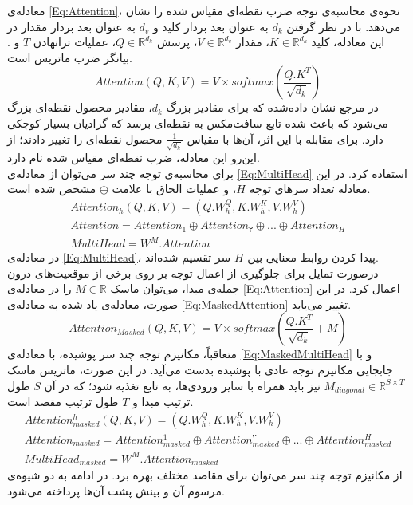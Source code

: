  معادله‌ی \ref{Eq:Attention}، نحوه‌ی محاسبه‌ی توجه ضرب نقطه‌ای مقیاس شده را نشان می‌دهد. با در نظر گرفتن $d_{k}$ به عنوان بعد بردار کلید و $d_{v}$ به عنوان بعد بردار مقدار در این معادله، کلید $K\in\mathbb{R}^{d_{k}}$، مقدار $V\in\mathbb{R}^{d_{v}}$، پرسش $Q\in\mathbb{R}^{d_{k}}$، عملیات ترانهادن $T$ و $.$ بیانگر ضرب ماتریس است. 
\begin{equation}
	Attention(Q, K, V) = V \times softmax(\frac{Q . K^{T}}{\sqrt{d_{k}}})
	\label{Eq:Attention}
\end{equation}
در مرجع \cite{transformer} نشان داده‌شده که برای مقادیر بزرگ $d_{k}$، مقادیر محصول نقطه‌ای بزرگ می‌شود که باعث شده تابع سافت‌مکس به نقطه‌ای برسد که گرادیان بسیار کوچکی دارد. برای مقابله با این اثر، آن‌ها با مقیاس $\frac{1}{\sqrt{d_{k}}}$ محصول نقطه‌ای را تغییر دادند؛ از این‌رو این معادله، ضرب نقطه‌ای مقیاس شده نام دارد.
\\
برای محاسبه‌ی توجه چند سر می‌توان از معادله‌ی \ref{Eq:MultiHead} استفاده کرد. در این معادله تعداد سرهای توجه $H$، و عملیات الحاق با علامت $⊕$ مشخص شده است.
\begin{equation}
	\begin{array}{l}
		Attention_{h}(Q, K, V) = (Q . W_{h}^{Q}, K . W_{h}^{K}, V . W_{h}^{V}) \\
		Attention = Attention_{1} ⊕ Attention_{۲} ⊕ ... ⊕ Attention_{H} \\
		MultiHead = W^{M} . Attention
	\end{array}
	\label{Eq:MultiHead}
\end{equation}
در معادله‌ی \ref{Eq:MultiHead}، پیدا کردن روابط معنایی بین $H$ سر تقسیم شده‌اند. 
\\
درصورت تمایل برای جلوگیری از اعمال توجه بر روی برخی از موقعیت‌های درون جمله‌ی مبدا، می‌توان ماسک $M\in\mathbb{R}$ را در معادله‌ی \ref{Eq:Attention} اعمال کرد. در این صورت، معادله‌ی یاد شده به معادله‌ی \ref{Eq:MaskedAttention} تغییر می‌یابد.
\begin{equation}
	Attention_{Masked}(Q, K, V) = V \times softmax(\frac{Q . K^{T}}{\sqrt{d_{k}}}+M)
	\label{Eq:MaskedAttention}
\end{equation}
متعاقباً، مکانیزم توجه چند سر پوشیده، با معادله‌ی \ref{Eq:MaskedMultiHead} و با جابجایی مکانیزم توجه عادی با پوشیده بدست می‌آید. در این صورت، ماتریس ماسک $M_{diagonal}\in\mathbb{R}^{S\times T}$ نیز باید همراه با سایر ورودی‌ها، به تابع تغذیه شود؛ که در آن $S$ طول ترتیب مبدا و $T$ طول ترتیب مقصد است.
\begin{equation}
	\begin{array}{l}
		Attention^{h}_{masked}(Q, K, V) = (Q . W_{h}^{Q}, K . W_{h}^{K}, V . W_{h}^{V}) \\
		Attention_{masked} = Attention_{masked}^{1} ⊕ Attention_{masked}^{۲} ⊕ ... ⊕ Attention_{masked}^{H} \\
		MultiHead_{masked} = W^{M} . Attention_{masked}
	\end{array}
	\label{Eq:MaskedMultiHead}
\end{equation}
از مکانیزم توجه چند سر می‌توان برای مقاصد مختلف بهره برد. در ادامه به دو شیوه‌ی مرسوم آن و بینش پشت آن‌ها پرداخته می‌شود.

